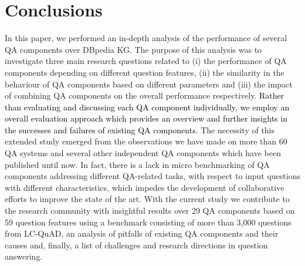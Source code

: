 \documentclass[sigconf,edbt]{acmart-edbt2019}
\begin{document}
\section{Conclusions} \label{sec:conclusions}
In this paper, we performed an in-depth analysis of the performance of several QA components over DBpedia KG. The purpose of this analysis was to investigate three main research questions related to (i) the performance of QA components depending on different question features, (ii) the similarity in the behaviour of QA components based on different parameters and (iii) the impact of combining QA components on the overall performance respectively. \textcolor{black}{Rather than evaluating and discussing each QA component individually, we employ an overall evaluation approach which provides an overview and further insights in the successes and failures of existing QA components.} The necessity of this extended study emerged from the observations we have made on more than 60 QA systems and several other independent QA components which have been published until now. In fact, there is a lack in micro benchmarking of QA components addressing different QA-related tasks, with respect to input questions with different characteristics, which impedes the development of collaborative efforts to improve the state of the art.
With the current study we contribute to the research community with insightful results over 29 QA components based on 59 question features using a benchmark consisting of more than 3,000 questions from LC-QuAD, an analysis of pitfalls of existing QA components and their causes and, finally, a list of challenges and research directions in question answering. 
\end{document}
